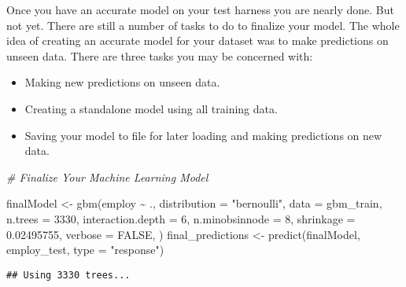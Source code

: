 \documentclass[
]{book}
\newenvironment{Shaded}{\begin{snugshade}}{\end{snugshade}}
\newcommand{\AttributeTok}[1]{\textcolor[rgb]{0.77,0.63,0.00}{#1}}
\newcommand{\CommentTok}[1]{\textcolor[rgb]{0.56,0.35,0.01}{\textit{#1}}}
\newcommand{\ConstantTok}[1]{\textcolor[rgb]{0.00,0.00,0.00}{#1}}
\newcommand{\DecValTok}[1]{\textcolor[rgb]{0.00,0.00,0.81}{#1}}
\newcommand{\FloatTok}[1]{\textcolor[rgb]{0.00,0.00,0.81}{#1}}
\newcommand{\FunctionTok}[1]{\textcolor[rgb]{0.00,0.00,0.00}{#1}}
\newcommand{\NormalTok}[1]{#1}
\newcommand{\OtherTok}[1]{\textcolor[rgb]{0.56,0.35,0.01}{#1}}
\newcommand{\SpecialCharTok}[1]{\textcolor[rgb]{0.00,0.00,0.00}{#1}}
\newcommand{\StringTok}[1]{\textcolor[rgb]{0.31,0.60,0.02}{#1}}
\providecommand{\tightlist}{%
  \setlength{\itemsep}{0pt}\setlength{\parskip}{0pt}}
\begin{document}
Once you have an accurate model on your test harness you are nearly done. But not yet. There are still a number of tasks to do to finalize your model. The whole idea of creating an accurate model for your dataset was to make predictions on unseen data. There are three tasks you may be concerned with:

\begin{itemize}
\tightlist
\item
  Making new predictions on unseen data.
\item
  Creating a standalone model using all training data.
\item
  Saving your model to file for later loading and making predictions on new data.
\end{itemize}

\begin{Shaded}
\begin{Highlighting}[]
\CommentTok{\# Finalize Your Machine Learning Model}

\NormalTok{finalModel }\OtherTok{\textless{}{-}} \FunctionTok{gbm}\NormalTok{(employ }\SpecialCharTok{\textasciitilde{}}\NormalTok{ .,}
  \AttributeTok{distribution =} \StringTok{"bernoulli"}\NormalTok{,}
  \AttributeTok{data =}\NormalTok{ gbm\_train,}
  \AttributeTok{n.trees =} \DecValTok{3330}\NormalTok{,}
  \AttributeTok{interaction.depth =} \DecValTok{6}\NormalTok{,}
  \AttributeTok{n.minobsinnode =} \DecValTok{8}\NormalTok{,}
  \AttributeTok{shrinkage =} \FloatTok{0.02495755}\NormalTok{,}
  \AttributeTok{verbose =} \ConstantTok{FALSE}\NormalTok{,}
\NormalTok{  )}
\NormalTok{final\_predictions }\OtherTok{\textless{}{-}} \FunctionTok{predict}\NormalTok{(finalModel, employ\_test, }
                             \AttributeTok{type =} \StringTok{"response"}\NormalTok{)}
\end{Highlighting}
\end{Shaded}

\begin{verbatim}
## Using 3330 trees...
\end{verbatim}

\begin{Shaded}
\end{Shaded}
\end{document}
